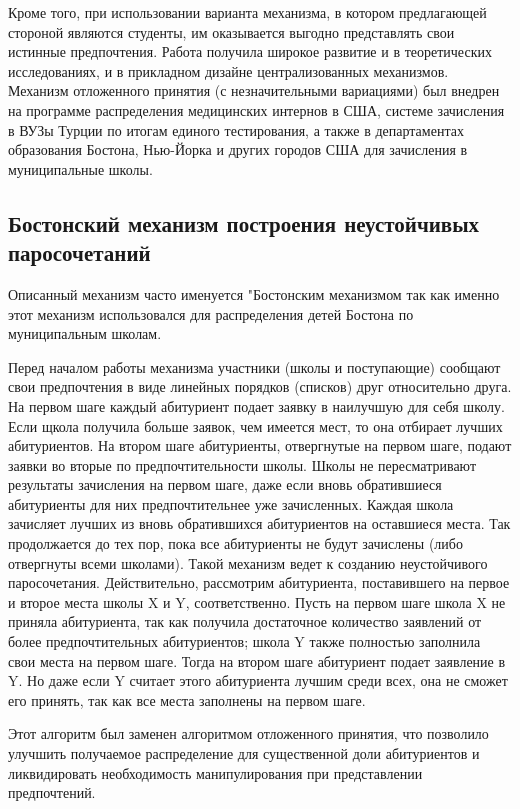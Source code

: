 Кроме того, при использовании варианта механизма, в котором предлагающей стороной являются студенты, им оказывается выгодно представлять свои истинные предпочтения. Работа\cite{gale} получила широкое развитие и в теоретических исследованиях, и в прикладном дизайне централизованных механизмов. Механизм
отложенного принятия (с незначительными вариациями) был внедрен
на программе распределения медицинских интернов в США, системе
зачисления в ВУЗы Турции по итогам единого тестирования, а также
в департаментах образования Бостона, Нью-Йорка и других городов
США для зачисления в муниципальные школы.

\subsection{Бостонский механизм построения неустойчивых паросочетаний}

Описанный механизм часто именуется "Бостонским механизмом так как именно этот механизм использовался для распределения детей Бостона по муниципальным школам.

Перед началом работы механизма участники (школы и поступающие)
сообщают свои предпочтения в виде линейных порядков (списков) друг
относительно друга. На первом шаге каждый абитуриент подает заявку
в наилучшую для себя школу. Если щкола получила больше заявок, чем
имеется мест, то она отбирает лучших абитуриентов. На втором шаге
абитуриенты, отвергнутые на первом шаге, подают заявки во вторые по
предпочтительности школы. Школы не пересматривают результаты зачисления на первом шаге, даже если вновь обратившиеся абитуриенты
для них предпочтительнее уже зачисленных. Каждая школа зачисляет
лучших из вновь обратившихся абитуриентов на оставшиеся места. Так
продолжается до тех пор, пока все абитуриенты не будут зачислены
(либо отвергнуты всеми школами).
Такой механизм ведет к созданию неустойчивого паросочетания. Действительно, рассмотрим абитуриента, поставившего на первое и второе
места школы X и Y, соответственно. Пусть на первом шаге школа X не
приняла абитуриента, так как получила достаточное количество заявлений
от более предпочтительных абитуриентов; школа Y также полностью
заполнила свои места на первом шаге. Тогда на втором шаге абитуриент
подает заявление в Y. Но даже если Y считает этого абитуриента лучшим среди всех, она не сможет его принять, так как все места заполнены
на первом шаге.


Этот алгоритм был заменен алгоритмом отложенного принятия, что позволило улучшить
получаемое распределение для существенной доли абитуриентов и ликвидировать необходимость манипулирования при представлении предпочтений.


